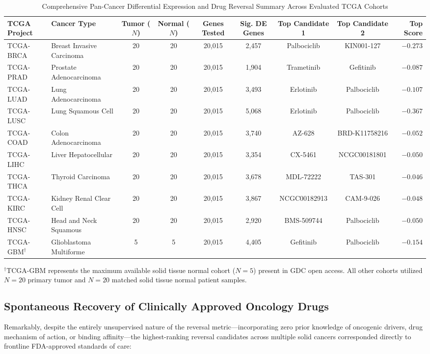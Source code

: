 \documentclass[10pt,journal,compsoc,twocolumn]{IEEEtran}
\begin{document}
\begin{table}[t]
\caption{Comprehensive Pan-Cancer Differential Expression and Drug Reversal Summary Across Evaluated TCGA Cohorts}
\label{tab:cohorts}
\centering
\small
\begin{tabular*}{\textwidth}{@{\extracolsep{\fill}}llccccccr@{}}
\toprule
\textbf{TCGA Project} & \textbf{Cancer Type} & \textbf{Tumor ($N$)} & \textbf{Normal ($N$)} & \textbf{Genes Tested} & \textbf{Sig. DE Genes} & \textbf{Top Candidate 1} & \textbf{Top Candidate 2} & \textbf{Top Score} \\
\midrule
TCGA-BRCA & Breast Invasive Carcinoma & 20 & 20 & 20,015 & 2,457 & Palbociclib & KIN001-127 & $-0.273$ \\
TCGA-PRAD & Prostate Adenocarcinoma & 20 & 20 & 20,015 & 1,904 & Trametinib & Gefitinib & $-0.087$ \\
TCGA-LUAD & Lung Adenocarcinoma & 20 & 20 & 20,015 & 3,493 & Erlotinib & Palbociclib & $-0.107$ \\
TCGA-LUSC & Lung Squamous Cell & 20 & 20 & 20,015 & 5,068 & Erlotinib & Palbociclib & $-0.367$ \\
TCGA-COAD & Colon Adenocarcinoma & 20 & 20 & 20,015 & 3,740 & AZ-628 & BRD-K11758216 & $-0.052$ \\
TCGA-LIHC & Liver Hepatocellular & 20 & 20 & 20,015 & 3,354 & CX-5461 & NCGC00181801 & $-0.050$ \\
TCGA-THCA & Thyroid Carcinoma & 20 & 20 & 20,015 & 3,678 & MDL-72222 & TAS-301 & $-0.046$ \\
TCGA-KIRC & Kidney Renal Clear Cell & 20 & 20 & 20,015 & 3,867 & NCGC00182913 & CAM-9-026 & $-0.048$ \\
TCGA-HNSC & Head and Neck Squamous & 20 & 20 & 20,015 & 2,920 & BMS-509744 & Palbociclib & $-0.050$ \\
TCGA-GBM$^\dagger$ & Glioblastoma Multiforme & 5 & 5 & 20,015 & 4,405 & Gefitinib & Palbociclib & $-0.154$ \\
\bottomrule
\end{tabular*}
\begin{flushleft}
\footnotesize{$^\dagger$TCGA-GBM represents the maximum available solid tissue normal cohort ($N=5$) present in GDC open access. All other cohorts utilized $N=20$ primary tumor and $N=20$ matched solid tissue normal patient samples.}
\end{flushleft}
\end{table}

\subsection{Spontaneous Recovery of Clinically Approved Oncology Drugs}
Remarkably, despite the entirely unsupervised nature of the reversal metric---incorporating zero prior knowledge of oncogenic drivers, drug mechanism of action, or binding affinity---the highest-ranking reversal candidates across multiple solid cancers corresponded directly to frontline FDA-approved standards of care:
\end{document}
